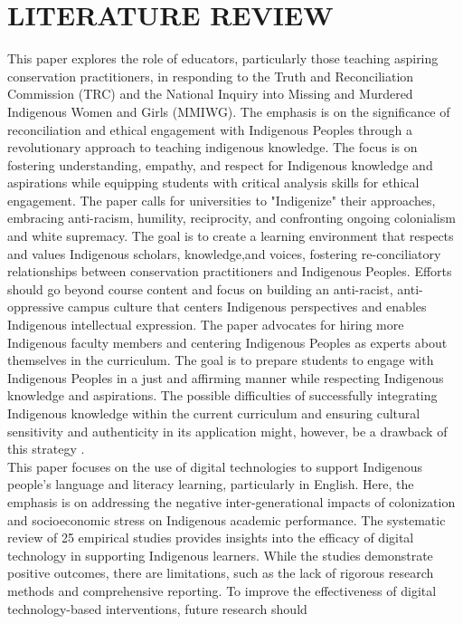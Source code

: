 \documentclass[a4paper,twoside]{article}
\begin{document}
\section{\uppercase{Literature Review}}
\label{sec:Literature Review}
This paper explores the role of educators, particularly those teaching aspiring conservation practitioners, in responding to the Truth and Reconciliation Commission (TRC) and the National Inquiry into Missing and Murdered Indigenous Women and Girls (MMIWG). The emphasis is on the significance of reconciliation and ethical engagement with Indigenous Peoples through a revolutionary approach to teaching indigenous knowledge. The focus is on fostering understanding, empathy, and respect for Indigenous knowledge and aspirations while equipping students with critical analysis skills for ethical engagement. The paper calls for universities to "Indigenize" their approaches, embracing anti-racism, humility, reciprocity, and confronting ongoing colonialism and white supremacy. The goal is to create a learning environment that respects and values Indigenous scholars, knowledge,and voices, fostering re-conciliatory relationships between conservation practitioners and Indigenous Peoples. Efforts should go beyond course content and focus on building an anti-racist, anti-oppressive campus culture that
centers Indigenous perspectives and enables Indigenous intellectual expression. The paper advocates for hiring more Indigenous faculty members and centering Indigenous Peoples as experts about themselves in the curriculum. The goal is to prepare students to engage with Indigenous Peoples in a just and affirming manner while respecting Indigenous knowledge and aspirations. The possible difficulties of successfully integrating Indigenous knowledge within the current curriculum and ensuring cultural sensitivity and authenticity in its application might, 
 however, be a drawback of this strategy \cite{Wu19}.
\\This paper focuses on the use of digital technologies to support Indigenous people’s language and literacy learning, particularly in English. Here, the emphasis is on addressing the negative inter-generational impacts of colonization and socioeconomic stress on Indigenous academic performance. The systematic review of 25 empirical studies provides insights into the efficacy of digital technology in supporting Indigenous learners. While the studies demonstrate positive outcomes, there are limitations, such as the lack of rigorous research methods and comprehensive reporting. To improve the effectiveness
of digital technology-based interventions, future research should
\end{document}
